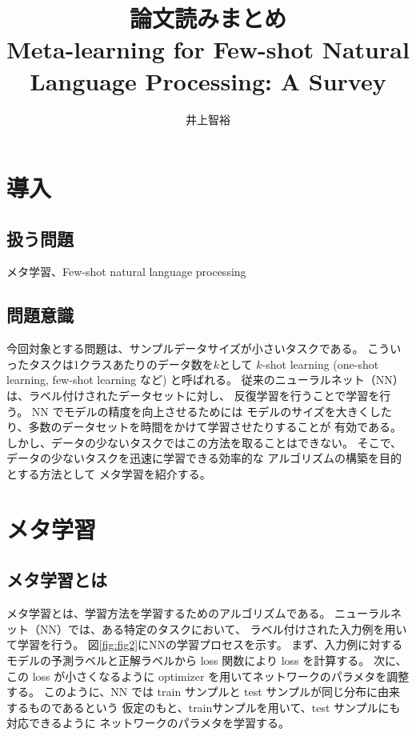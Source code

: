 \documentclass{jsarticle}
\title{\vspace{-3cm}論文読みまとめ
\\Meta-learning for Few-shot Natural Language Processing: A Survey}
\author{井上智裕}
\begin{document}
\maketitle
\vspace{-1cm}
\section{導入}
\subsection{扱う問題}
メタ学習、Few-shot natural language processing 

\subsection{問題意識}
今回対象とする問題は、サンプルデータサイズが小さいタスクである。
こういったタスクは1クラスあたりのデータ数を$k$として $k$-shot learning 
(one-shot learning, few-shot learning など) と呼ばれる。
従来のニューラルネット（NN）は、ラベル付けされたデータセットに対し、
反復学習を行うことで学習を行う。
NN でモデルの精度を向上させるためには
モデルのサイズを大きくしたり、多数のデータセットを時間をかけて学習させたりすることが
有効である。
しかし、データの少ないタスクではこの方法を取ることはできない。
そこで、データの少ないタスクを迅速に学習できる効率的な
アルゴリズムの構築を目的とする方法として
メタ学習を紹介する。

\section{メタ学習}
\subsection{メタ学習とは}
メタ学習とは、学習方法を学習するためのアルゴリズムである。
ニューラルネット（NN）では、ある特定のタスクにおいて、
ラベル付けされた入力例を用いて学習を行う。
図\ref{fig:fig2}\cite{meta-thomas}にNNの学習プロセスを示す。
まず、入力例に対するモデルの予測ラベルと正解ラベルから loss 関数により loss を計算する。
次に、この loss が小さくなるように optimizer を用いてネットワークのパラメタを調整する。
このように、NN では train サンプルと test サンプルが同じ分布に由来するものであるという
仮定のもと、trainサンプルを用いて、test サンプルにも対応できるように
ネットワークのパラメタを学習する。
\end{document}
